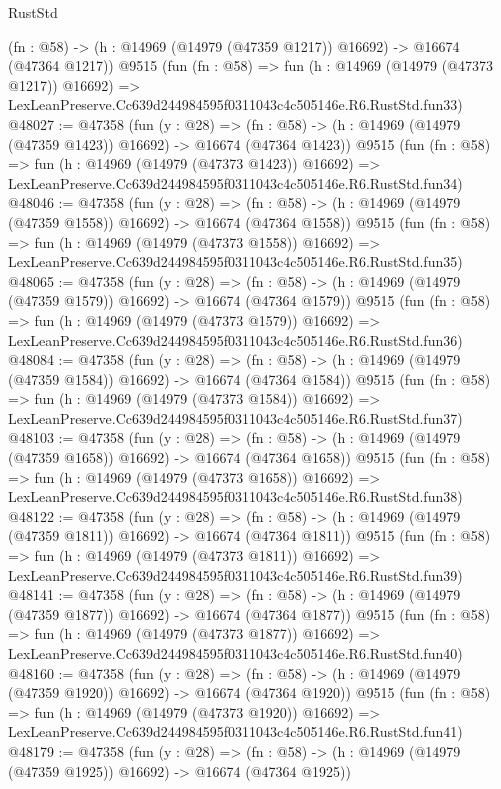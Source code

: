 \begin{lexlean}{RustStd}
\begin{coremodule}
    (fn : @58) -> (h : @14969 (@14979 (@47359 @1217)) @16692) -> @16674 (@47364 @1217))
    @9515
    (fun (fn : @58) =>
    fun (h : @14969 (@14979 (@47373 @1217)) @16692) =>
    LexLeanPreserve.Cc639d244984595f0311043c4c505146e.R6.RustStd.fun33)
@48027 := @47358
    (fun (y : @28) =>
    (fn : @58) -> (h : @14969 (@14979 (@47359 @1423)) @16692) -> @16674 (@47364 @1423))
    @9515
    (fun (fn : @58) =>
    fun (h : @14969 (@14979 (@47373 @1423)) @16692) =>
    LexLeanPreserve.Cc639d244984595f0311043c4c505146e.R6.RustStd.fun34)
@48046 := @47358
    (fun (y : @28) =>
    (fn : @58) -> (h : @14969 (@14979 (@47359 @1558)) @16692) -> @16674 (@47364 @1558))
    @9515
    (fun (fn : @58) =>
    fun (h : @14969 (@14979 (@47373 @1558)) @16692) =>
    LexLeanPreserve.Cc639d244984595f0311043c4c505146e.R6.RustStd.fun35)
@48065 := @47358
    (fun (y : @28) =>
    (fn : @58) -> (h : @14969 (@14979 (@47359 @1579)) @16692) -> @16674 (@47364 @1579))
    @9515
    (fun (fn : @58) =>
    fun (h : @14969 (@14979 (@47373 @1579)) @16692) =>
    LexLeanPreserve.Cc639d244984595f0311043c4c505146e.R6.RustStd.fun36)
@48084 := @47358
    (fun (y : @28) =>
    (fn : @58) -> (h : @14969 (@14979 (@47359 @1584)) @16692) -> @16674 (@47364 @1584))
    @9515
    (fun (fn : @58) =>
    fun (h : @14969 (@14979 (@47373 @1584)) @16692) =>
    LexLeanPreserve.Cc639d244984595f0311043c4c505146e.R6.RustStd.fun37)
@48103 := @47358
    (fun (y : @28) =>
    (fn : @58) -> (h : @14969 (@14979 (@47359 @1658)) @16692) -> @16674 (@47364 @1658))
    @9515
    (fun (fn : @58) =>
    fun (h : @14969 (@14979 (@47373 @1658)) @16692) =>
    LexLeanPreserve.Cc639d244984595f0311043c4c505146e.R6.RustStd.fun38)
@48122 := @47358
    (fun (y : @28) =>
    (fn : @58) -> (h : @14969 (@14979 (@47359 @1811)) @16692) -> @16674 (@47364 @1811))
    @9515
    (fun (fn : @58) =>
    fun (h : @14969 (@14979 (@47373 @1811)) @16692) =>
    LexLeanPreserve.Cc639d244984595f0311043c4c505146e.R6.RustStd.fun39)
@48141 := @47358
    (fun (y : @28) =>
    (fn : @58) -> (h : @14969 (@14979 (@47359 @1877)) @16692) -> @16674 (@47364 @1877))
    @9515
    (fun (fn : @58) =>
    fun (h : @14969 (@14979 (@47373 @1877)) @16692) =>
    LexLeanPreserve.Cc639d244984595f0311043c4c505146e.R6.RustStd.fun40)
@48160 := @47358
    (fun (y : @28) =>
    (fn : @58) -> (h : @14969 (@14979 (@47359 @1920)) @16692) -> @16674 (@47364 @1920))
    @9515
    (fun (fn : @58) =>
    fun (h : @14969 (@14979 (@47373 @1920)) @16692) =>
    LexLeanPreserve.Cc639d244984595f0311043c4c505146e.R6.RustStd.fun41)
@48179 := @47358
    (fun (y : @28) =>
    (fn : @58) -> (h : @14969 (@14979 (@47359 @1925)) @16692) -> @16674 (@47364 @1925))

\end{coremodule}
\end{lexlean}
